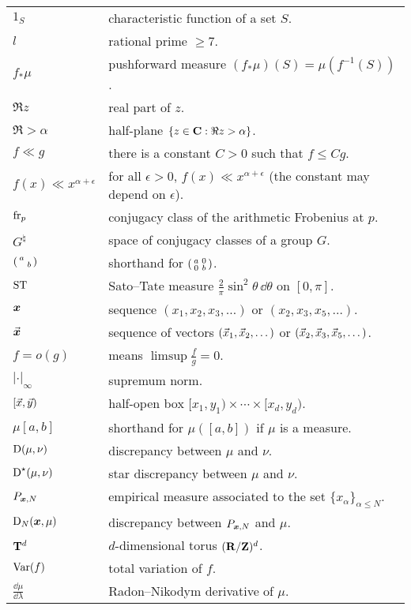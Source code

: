 \documentclass[phd,tocprelim]{cornell}
\begin{document}
\symlist

\begin{tabular}{ll}
$1_S$     
	& characteristic function of a set $S$. \\
$l$       
	& rational prime $\geqslant 7$. \\
$f_\ast\mu$
	& pushforward measure $(f_\ast\mu)(S) = \mu(f^{-1}(S))$. \\
$\Re z$
	& real part of $z$. \\
$\Re > \alpha$
	& half-plane $\{z\in \mathbf{C} : \Re z > \alpha\}$. \\
$f \ll g$ 
	& there is a constant $C>0$ such that $f \leqslant C g$. \\
$f(x) \ll x^{\alpha+\epsilon}$ 
	& for all $\epsilon>0$, $f(x) \ll x^{\alpha+\epsilon}$ (the constant may depend on $\epsilon$). \\
$\mathrm{fr}_p$
	& conjugacy class of the arithmetic Frobenius at $p$. \\
$G^\natural$
	& space of conjugacy classes of a group $G$. \\
$\left(\begin{smallmatrix} a &  \\  & b \end{smallmatrix}\right)$
	& shorthand for $\left(\begin{smallmatrix} a & 0 \\ 0 & b \end{smallmatrix}\right)$. \\
$\mathrm{ST}$
	& Sato--Tate measure $\frac{2}{\pi} \sin^2\theta\, \dd\theta$ on $[0,\pi]$. \\
${\boldsymbol x}$
	& sequence $(x_1,x_2,x_3,\dots)$ or $(x_2,x_3,x_5,\dots)$. \\
$\vec{\boldsymbol x}$
	& sequence of vectors $(\vec{x}_1,\vec{x}_2,\dots)$ or $(\vec{x}_2,\vec{x}_3,\vec{x}_5,\dots)$. \\
$f = o(g)$
	& means $\limsup \frac f g = 0$. \\
$|\cdot|_\infty$
	& supremum norm. \\
$[\vec{x},\vec{y})$
	& half-open box $[x_1,y_1) \times \cdots \times [x_d,y_d)$. \\
$\mu[a,b]$
	& shorthand for $\mu([a,b])$ if $\mu$ is a measure. \\
$\operatorname{D}(\mu,\nu)$
	& discrepancy between $\mu$ and $\nu$. \\
$\operatorname{D}^\star(\mu,\nu)$
	& star discrepancy between $\mu$ and $\nu$. \\
$P_{{\boldsymbol x},N}$
	& empirical measure associated to the set $\{x_\alpha\}_{\alpha\leqslant N}$. \\
$\operatorname{D}_N({\boldsymbol x},\mu)$
	& discrepancy between $P_{{\boldsymbol x},N}$ and $\mu$. \\
$\mathbf{T}^d$
	& $d$-dimensional torus $(\mathbf{R}/\mathbf{Z})^d$. \\
$\operatorname{Var}(f)$
	& total variation of $f$. \\
$\frac{\dd\mu}{\dd\lambda}$
	& Radon--Nikodym derivative of $\mu$. \\

\end{tabular}
\end{document}
